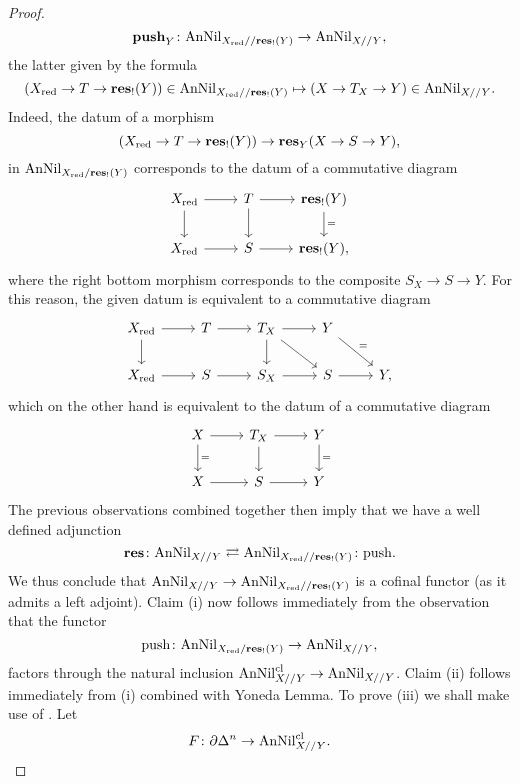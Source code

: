 \documentclass[10pt,a4paper,reqno]{amsart} %
\theoremstyle{plain}
\theoremstyle{definition}
\theoremstyle{remark}
\numberwithin{equation}{section}
\begin{document}
\begin{proof}
        \[
            \mathbf{push}_Y \colon \mathrm{AnNil}_{X_{\mathrm{red}} // \mathbf{res}_!(Y)} \to \mathrm{AnNil}_{X//Y},  
        \]
    the latter given by the formula
        \[
            (X_{\mathrm{red}} \to T \to \mathbf{res}_!(Y)) \in \mathrm{AnNil}_{X_{\mathrm{red}} // \mathbf{res}_!(Y)} \mapsto (X \to T_X \to Y)  \in \mathrm{AnNil}_{X//Y}.
        \]
    Indeed, the datum of a morphism
        \[
            (X_{\mathrm{red}} \to T \to \mathbf{res}_!(Y)) \to \mathbf{res}_Y(X \to S \to Y),  
        \]
    in $\mathrm{AnNil}_{X_{\mathrm{red}} / \mathbf{res}_!(Y)}$ corresponds to the datum of a commutative diagram
        \[
        \begin{tikzcd}
          X_\red \ar{r} \ar{d} & T \ar{r} \ar{d} & \mathbf{res}_!(Y) \ar{d}{=} \\
          X_\red \ar{r} & S \ar{r} & \mathbf{res}_!(Y),  
        \end{tikzcd}
        \]
    where the right bottom morphism corresponds to the composite $S_X \to S \to Y$. For this reason, the given datum is equivalent to a commutative diagram
        \[
        \begin{tikzcd}
            X_\red \ar{r} \ar{d} & T \ar{r} &  T_X \ar{r} \ar{rd} \ar{d}  & Y \ar{rd}{=} \\
            X_\red \ar{r} & S \ar{r} &  S_X \ar{r} & S \ar{r} & Y,
        \end{tikzcd}
        \]
    which on the other hand is equivalent to the datum of a commutative diagram
        \[
        \begin{tikzcd}
            X \ar{r} \ar{d}{=} & T_X \ar{r} \ar{d} & Y \ar{d}{=} \\
            X \ar{r} & S \ar{r} & Y
        \end{tikzcd}
        \]
    The previous observations combined together then imply that we have a well defined adjunction
        \[
            \mathbf{res} \colon \mathrm{AnNil}_{X/ /Y} \rightleftarrows \mathrm{AnNil}_{X_{\mathrm{red}} // \mathbf{res}_!(Y)} \colon \mathrm{push}.
        \]
    We thus conclude that $\mathrm{AnNil}_{X//Y} \to \mathrm{AnNil}_{X_{\mathrm{red}} // \mathbf{res}_!(Y)}$ is a cofinal functor (as it admits a left adjoint). Claim (i) now follows
    immediately from the observation that the functor
        \[
            \mathrm{push} \colon \mathrm{AnNil}_{X_{\mathrm{red}} / \mathbf{res}_!(Y)} \to \mathrm{AnNil}_{X//Y},  
        \]
    factors through the natural inclusion $\mathrm{AnNil}_{X//Y}^{\mathrm{cl}} \to \mathrm{AnNil}_{X//Y}$.
    Claim (ii) follows immediately from (i) combined with Yoneda Lemma. To prove (iii) we shall make use of \cite[Lemma 5.3.1.12]{HTT}. Let
        \[
            F \colon \partial \Delta^n \to \mathrm{AnNil}^{\mathrm{cl}}_{X//Y}.  
\]
\end{proof}
\end{document}
